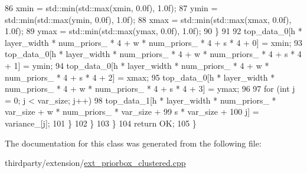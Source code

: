 \begin{DoxyCode}
86                         xmin = std::min(std::max(xmin, 0.0f), 1.0f);
87                         ymin = std::min(std::max(ymin, 0.0f), 1.0f);
88                         xmax = std::min(std::max(xmax, 0.0f), 1.0f);
89                         ymax = std::min(std::max(ymax, 0.0f), 1.0f);
90                     \}
91 
92                     top\_data\_0[h * layer\_width * num\_priors\_ * 4 + w * num\_priors\_ * 4 + s * 4 + 0] = xmin;
93                     top\_data\_0[h * layer\_width * num\_priors\_ * 4 + w * num\_priors\_ * 4 + s * 4 + 1] = ymin;
94                     top\_data\_0[h * layer\_width * num\_priors\_ * 4 + w * num\_priors\_ * 4 + s * 4 + 2] = xmax;
95                     top\_data\_0[h * layer\_width * num\_priors\_ * 4 + w * num\_priors\_ * 4 + s * 4 + 3] = ymax;
96 
97                     \textcolor{keywordflow}{for} (\textcolor{keywordtype}{int} j = 0; j < var\_size; j++)
98                         top\_data\_1[h * layer\_width * num\_priors\_ * var\_size + w * num\_priors\_ * var\_size +
99                                    s * var\_size +
100                                    j] = variance\_[j];
101                 \}
102             \}
103         \}
104         \textcolor{keywordflow}{return} OK;
105     \}
\end{DoxyCode}


The documentation for this class was generated from the following file\+:\begin{DoxyCompactItemize}
\item 
thirdparty/extension/\hyperlink{ext__priorbox__clustered_8cpp}{ext\+\_\+priorbox\+\_\+clustered.\+cpp}\end{DoxyCompactItemize}
